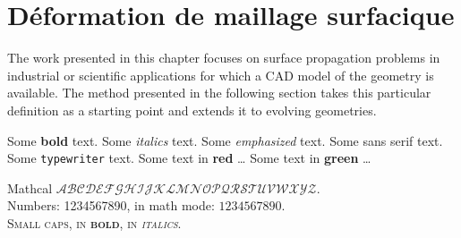 \def\chapterabstract{In this chapter, we present a set of methods designed for tracking with high-order accuracy the propagation of surfaces in three dimensions with arbitrary geometric and topological complexity. Targeted applications are engineering and scientific problems for which a CAD (computer-aided design) model of the geometry is available, i.e. surface patches with high-order parameterizations as well as topological connectivity. Our method uses and maintains such a representation throughout the propagation. Validity of the dynamic boundary-representation model is ensured by handling geometric singularities. Examples are presented to demonstrate the accuracy of the pseudo-spectral method used for tracking each surface patch.
A strategy for deriving a dynamic surface mesh is finally proposed for applications such as Finite Element/Volume computations with body-fitted volume grids in domains with deforming boundaries. }

\chapter{Déformation de maillage surfacique}


\printskip
\printchapapp
The work presented in this chapter focuses on surface propagation problems in industrial or scientific applications for which a CAD model of the geometry is available. The method presented in the following section takes this particular definition as a starting point and extends it to evolving geometries. \par

Some \textbf{bold} text. Some \textit{italics} text. Some \emph{emphasized} text. Some \textsf{sans serif} text. Some \texttt{typewriter} text. {\color{myred} Some text in \textbf{red} \ldots} {\color{mygreen} Some text in \textbf{green} \ldots} \par
Mathcal $\mathcal{ABCDEFGHIJKLMNOPQRSTUVWXYZ}$.\\
Numbers: 1234567890, in math mode: $1234567890$.\\
{\scshape Small caps, in \textbf{bold}, in \textit{italics}.}

